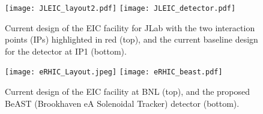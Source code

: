 \begin{figure}[ht]
	\centering
	\texttt{[image: JLEIC\_layout2.pdf]}
	\texttt{[image: JLEIC\_detector.pdf]}
	\caption{Current design of the EIC facility for JLab with the two interaction points (IPs) highlighted in red (top), and the current baseline design for the detector at IP1 (bottom).}
	\label{fig:jleic_layout}
\end{figure}

\begin{figure}[ht]
	\centering
	\texttt{[image: eRHIC\_Layout.jpeg]}
	\texttt{[image: eRHIC\_beast.pdf]}
	\caption{Current design of the EIC facility at BNL (top), and the proposed BeAST (Brookhaven eA Solenoidal Tracker) detector (bottom).}
	\label{fig:erhic_layout}
\end{figure}